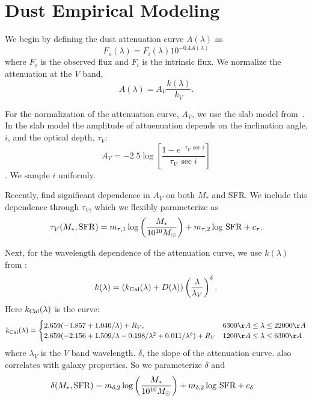 \section{Dust Empirical Modeling} \label{sec:methods}

We begin by defining the dust attenuation curve $A(\lambda)$ as 
\begin{equation} 
    F_o (\lambda) = F_i (\lambda) 10^{-0.4 A(\lambda)}
\end{equation}
where $F_o$ is the observed flux and $F_i$ is the intrinsic flux. We normalize the attenuation at the $V$ band, 
\begin{equation} 
    A(\lambda) = A_V \frac{k(\lambda)}{k_V}. 
\end{equation}


For the normalization of the attenuation curve, $A_V$, we use the slab model
from~\cite{somerville1999, somerville2012}. In the slab model the amplitude of
attuenuation depends on the inclination angle, $i$, and the optical depth,
$\tau_V$: 
\begin{equation} 
    A_V = -2.5 \log \left[ \frac{1 - e^{-\tau_V\,\sec i}}{\tau_V\,\sec i} \right]
\end{equation}
. We sample $i$ uniformly.

Recently, \cite{salim2020} find significant dependence in $A_V$ on both $M_*$
and SFR. We include this dependence through $\tau_V$, which we flexibly
parameterize as 
\begin{equation}
    \tau_V(M_*, {\rm SFR}) = m_{\tau,1} \log \left(\frac{M_*}{10^{10} M_\odot}\right) +
    m_{\tau,2} \log\,{\rm SFR} + c_\tau.
\end{equation}

Next, for the wavelength dependence of the attenuation curve, we use $k(\lambda)$ from 
\cite{noll2009}: 
\begin{equation}
    k(\lambda) = \left(k_{\rm Cal}(\lambda) + D(\lambda)\right) \left(
    \frac{\lambda}{\lambda_V} \right)^\delta.
\end{equation}
Here $k_{\rm Cal}(\lambda)$ is the \cite{calzetti2001} curve: 
\[
    k_{\rm Cal}(\lambda) = 
    \begin{cases} 
        2.659 (-1.857 + 1.040/\lambda) + R_V, & 6300 \AA \le \lambda \le
        22000 \AA \\ 
        2.659 (-2.156 + 1.509/\lambda - 0.198/\lambda^2 + 0.011/\lambda^3) +
        R_V & 1200 \AA \le \lambda \le 6300 \AA
    \end{cases}
\]
where $\lambda_V$ is the $V$ band wavelength. $\delta$, the slope of the attenuation curve.
also correlates with galaxy
properties.
So we parameterize $\delta$ and 
\begin{align}
    \delta(M_*, {\rm SFR}) &= m_{\delta,2} \log \left(\frac{M_*}{10^{10}
    M_\odot}\right) + m_{\delta,2} \log\,{\rm SFR} + c_\delta 
\end{align}

